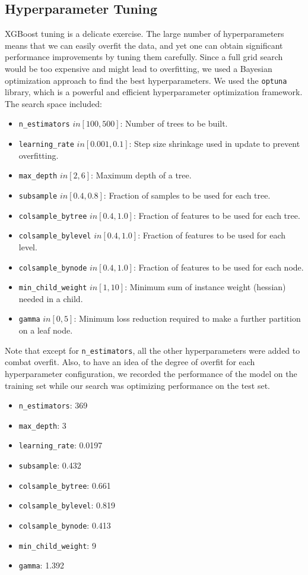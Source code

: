 \documentclass{article}
\begin{document}
\subsection{Hyperparameter Tuning}
XGBoost tuning is a delicate exercise. The large number of hyperparameters means that we can easily overfit the data, and yet one can obtain significant performance improvements by tuning them carefully. Since a full grid search would be too expensive and might lead to overfitting, we used a Bayesian optimization approach to find the best hyperparameters. We used the \texttt{optuna} library, which is a powerful and efficient hyperparameter optimization framework. The search space included:
\begin{itemize}
    \item \texttt{n\_estimators} $in [100, 500]$: Number of trees to be built.
    \item \texttt{learning\_rate} $in [0.001, 0.1]$: Step size shrinkage used in update to prevent overfitting.
    \item \texttt{max\_depth} $in [2, 6]$: Maximum depth of a tree.
    \item \texttt{subsample} $in [0.4, 0.8]$: Fraction of samples to be used for each tree.
    \item \texttt{colsample\_bytree} $in [0.4, 1.0]$: Fraction of features to be used for each tree.
    \item \texttt{colsample\_bylevel} $in [0.4, 1.0]$: Fraction of features to be used for each level.
    \item \texttt{colsample\_bynode} $in [0.4, 1.0]$: Fraction of features to be used for each node.
    \item \texttt{min_child\_weight} $in [1, 10]$: Minimum sum of instance weight (hessian) needed in a child.
    \item \texttt{gamma} $in [0, 5]$: Minimum loss reduction required to make a further partition on a leaf node.
\end{itemize}
Note that except for \texttt{n\_estimators}, all the other hyperparameters were added to combat overfit. Also, to have an idea of the degree of overfit for each hyperparameter configuration, we recorded the performance of the model on the training set while our search was optimizing performance on the test set.

\begin{itemize}
    \item \texttt{n\_estimators}: 369
    \item \texttt{max\_depth}: 3
    \item \texttt{learning\_rate}: 0.0197
    \item \texttt{subsample}: 0.432
    \item \texttt{colsample\_bytree}: 0.661
    \item \texttt{colsample\_bylevel}: 0.819
    \item \texttt{colsample\_bynode}: 0.413
    \item \texttt{min\_child\_weight}: 9
    \item \texttt{gamma}: 1.392
\end{itemize}
\end{document}
